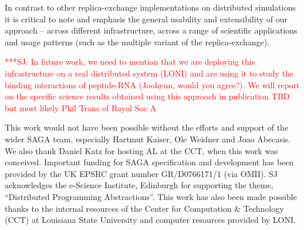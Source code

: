 \documentclass[times, 10pt,twocolumn]{article}
\newcommand{\jhanote}[1]{ {\textcolor{red} { ***SJ: #1 }}}
\newcommand{\jhanote}[1]{}
\begin{document}
In contrast to other replica-exchange implementations on distributed
simulations it is critical to note and emphasis the general usability
and extensibility of our approach -- across different infrastructure,
across a range of scientific applications and usage patterns (such as
the multiple variant of the replica-exchange).

\jhanote{In future work, we need to mention that we are deploying this
  infrastructure on a real distributed system (LONI) and are using it
  to study the binding interactions of peptide-RNA (Joohyun, would you
  agree?). We will report on the specific science results obtained
  using this approach in publication TBD but most likely Phil Trans of
  Royal Soc A}

This work would not have been possible without the efforts and support
of the wider SAGA team, especially Hartmut Kaiser, Ole Weidner and
Joao Abecasis. We also thank Daniel Katz for hosting AL at the CCT,
when this work was conceived.  Important funding for SAGA
specification and development has been provided by the UK EPSRC grant
number GR/D0766171/1 (via OMII).  SJ acknowledges the e-Science
Institute, Edinburgh for supporting the theme, ``Distributed
Programming Abstractions''.  This work has also been made possible
thanks to the internal resources of the Center for Computation \&
Technology (CCT) at Louisiana State University and computer resources
provided by LONI.  

\end{document}
